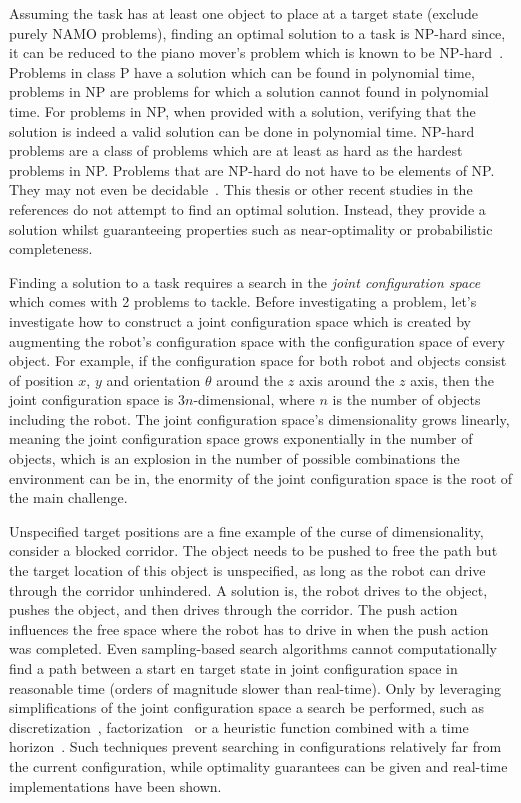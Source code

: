 Assuming the task has at least one object to place at a target state (exclude purely \ac{NAMO} problems), finding an optimal solution to a task is \ac{NP-hard} since, it can be reduced to the piano mover's problem which is known to be \ac{NP-hard}~\cite{reif_motion_1985}.\\Problems in class P have a solution which can be found in polynomial time, problems in \ac{NP} are problems for which a solution cannot found in polynomial time. For problems in \ac{NP}, when provided with a solution, verifying that the solution is indeed a valid solution can be done in polynomial time. \ac{NP-hard} problems are a class of problems which are at least as hard as the hardest problems in \ac{NP}. Problems that are \ac{NP-hard} do not have to be elements of NP. They may not even be decidable~\cite{pokharel_computational_2020}. This thesis or other recent studies in the references do not attempt to find an optimal solution. Instead, they provide a solution whilst guaranteeing properties such as near-optimality or probabilistic completeness.\bs

Finding a solution to a task requires a search in the \textit{joint configuration space} which comes with 2 problems to tackle. Before investigating a problem, let's investigate how to construct a joint configuration space which is created by augmenting the robot's configuration space with the configuration space of every object. For example, if the configuration space for both robot and objects consist of position $x$, $y$ and orientation $\theta$ around the $z$ axis around the $z$ axis, then the joint configuration space is $3n$-dimensional, where $n$ is the number of objects including the robot. The joint configuration space's dimensionality grows linearly, meaning the joint configuration space grows exponentially in the number of objects, which is an explosion in the number of possible combinations the environment can be in, the enormity of the joint configuration space is the root of the main challenge.\bs

Unspecified target positions are a fine example of the curse of dimensionality, consider a blocked corridor. The object needs to be pushed to free the path but the target location of this object is unspecified, as long as the robot can drive through the corridor unhindered. A solution is, the robot drives to the object, pushes the object, and then drives through the corridor. The push action influences the free space where the robot has to drive in when the push action was completed. Even sampling-based search algorithms cannot computationally find a path between a start en target state in joint configuration space in reasonable time (orders of magnitude slower than real-time). Only by leveraging simplifications of the joint configuration space a search be performed, such as discretization~\cite{sabbaghnovin_optimal_2016}, factorization~\cite{vega-brown_asymptotically_2020} or a heuristic function combined with a time horizon~\cite{sabbaghnovin_optimal_2016}. Such techniques prevent searching in configurations relatively far from the current configuration, while optimality guarantees can be given and real-time implementations have been shown.\bs

